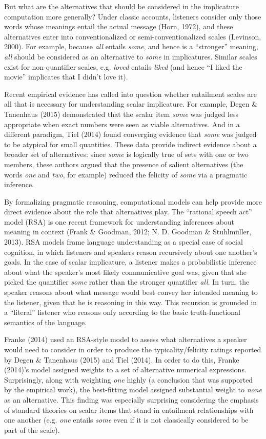\documentclass[10pt, letterpaper]{article}
\begin{document}
But what are the alternatives that should be considered in the
implicature computation more generally? Under classic accounts,
listeners consider only those words whose meanings entail the actual
message (Horn, 1972), and these alternatives enter into conventionalized
or semi-conventionalized scales (Levinson, 2000). For example, because
\emph{all} entails \emph{some}, and hence is a ``stronger'' meaning,
\emph{all} should be considered as an alternative to \emph{some} in
implicatures. Similar scales exist for non-quantifier scales, e.g.
\emph{loved} entails \emph{liked} (and hence ``I liked the movie''
implicates that I didn't love it).

Recent empirical evidence has called into question whether entailment
scales are all that is necessary for understanding scalar implicature.
For example, Degen \& Tanenhaus (2015) demonstrated that the scalar item
\emph{some} was judged less appropriate when exact numbers were seen as
viable alternatives. And in a different paradigm, Tiel (2014) found
converging evidence that \emph{some} was judged to be atypical for small
quantities. These data provide indirect evidence about a broader set of
alternatives: since \emph{some} is logically true of sets with one or
two members, these authors argued that the presence of salient
alternatives (the words \emph{one} and \emph{two}, for example) reduced
the felicity of \emph{some} via a pragmatic inference.

By formalizing pragmatic reasoning, computational models can help
provide more direct evidence about the role that alternatives play. The
``rational speech act'' model (RSA) is one recent framework for
understanding inferences about meaning in context (Frank \& Goodman,
2012; N. D. Goodman \& Stuhlm{ü}ller, 2013). RSA models frame language
understanding as a special case of social cognition, in which listeners
and speakers reason recursively about one another's goals. In the case
of scalar implicature, a listener makes a probabilistic inference about
what the speaker's most likely communicative goal was, given that she
picked the quantifier \emph{some} rather than the stronger quantifier
\emph{all}. In turn, the speaker reasons about what message would best
convey her intended meaning to the listener, given that he is reasoning
in this way. This recursion is grounded in a ``literal'' listener who
reasons only according to the basic truth-functional semantics of the
language.

Franke (2014) used an RSA-style model to assess what alternatives a
speaker would need to consider in order to produce the
typicality/felicity ratings reported by Degen \& Tanenhaus (2015) and
Tiel (2014). In order to do this, Franke (2014)'s model assigned weights
to a set of alternative numerical expressions. Surprisingly, along with
weighting \emph{one} highly (a conclusion that was supported by the
empirical work), the best-fitting model assigned substantial weight to
\emph{none} as an alternative. This finding was especially surprising
considering the emphasis of standard theories on scalar items that stand
in entailment relationships with one another (e.g. \emph{one} entails
\emph{some} even if it is not classically considered to be part of the
scale).
\end{document}
